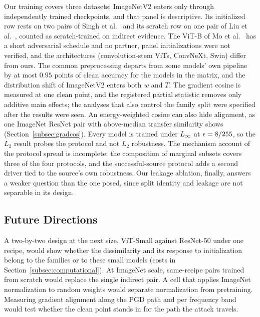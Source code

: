 Our training covers three datasets; ImageNetV2 enters only through independently trained checkpoints, and that panel is descriptive. Its initialized row rests on two pairs of Singh et al.~\cite{singh2023revisiting} and its scratch row on one pair of Liu et al.~\cite{liu2023comprehensive}, counted as scratch-trained on indirect evidence. The ViT-B of Mo et al.~\cite{mo2022adversarial} has a short adversarial schedule and no partner, panel initializations were not verified, and the architectures (convolution-stem ViTs, ConvNeXt, Swin) differ from ours. The common preprocessing departs from some models' own pipeline by at most $0.95$ points of clean accuracy for the models in the matrix, and the distribution shift of ImageNetV2 enters both $w$ and $T$. The gradient cosine is measured at one clean point, and the registered partial statistic removes only additive main effects; the analyses that also control the family split were specified after the results were seen. An energy-weighted cosine can also hide alignment, as one ImageNet ResNet pair with above-median transfer similarity shows (Section~\ref{subsec:gradcos}). Every model is trained under $L_\infty$ at $\epsilon = 8/255$, so the $L_2$ result probes the protocol and not $L_2$ robustness. The mechanism account of the protocol spread is incomplete: the composition of marginal subsets covers three of the four protocols, and the successful-source protocol adds a second driver tied to the source's own robustness. Our leakage ablation, finally, answers a weaker question than the one posed, since split identity and leakage are not separable in its design.

\subsection{Future Directions}
\label{subsec:future}

A two-by-two design at the next size, ViT-Small against ResNet-50 under one recipe, would show whether the dissimilarity and its response to initialization belong to the families or to these small models (costs in Section~\ref{subsec:computational}). At ImageNet scale, same-recipe pairs trained from scratch would replace the single indirect pair. A cell that applies ImageNet normalization to random weights would separate normalization from pretraining. Measuring gradient alignment along the PGD path and per frequency band would test whether the clean point stands in for the path the attack travels.
